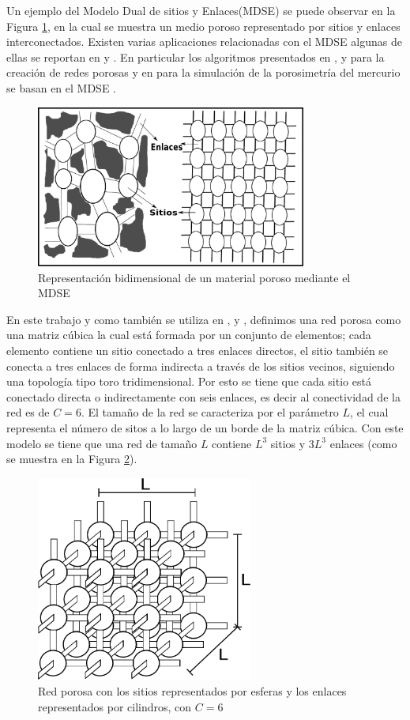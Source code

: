 Un ejemplo del Modelo Dual de sitios y Enlaces(MDSE) se puede observar en la Figura \ref{fig:dbsm}, en la cual se muestra un medio poroso representado por sitios y enlaces interconectados. Existen varias aplicaciones relacionadas con el MDSE algunas de ellas se reportan en \cite{ref8} y \cite{ref10}. En particular los algoritmos presentados en \cite{ref2}, \cite{ref3} y \cite{ref4} para la creación de redes porosas y en \cite{ref7} para la simulación de la porosimetría del mercurio se basan en el MDSE \cite{ref1}.\\

\begin{figure}[hbtp]
\centering
\includegraphics[width=3.5in]{img/dsbm_es.pdf}
\caption{Representación bidimensional de un material poroso mediante el MDSE}
\label{fig:dbsm}
\end{figure}

En este trabajo y como también se utiliza en \cite{ref2}, \cite{ref3} y \cite{ref4}, definimos una red porosa como una matriz cúbica la cual está formada por un conjunto de elementos; cada elemento contiene un sitio conectado a tres enlaces directos, el sitio tambi\'en se conecta a tres enlaces de forma indirecta a través de los sitios vecinos, siguiendo una topología tipo toro tridimensional. Por esto se tiene que cada sitio est\'a conectado directa o indirectamente con seis enlaces, es decir al conectividad de la red es de $C=6$. El tamaño de la red se caracteriza por el parámetro $L$, el cual representa el número de sitos a lo largo de un borde de la matriz cúbica. Con este modelo se tiene que una red de tamaño $L$ contiene $L^3$ sitios y $3L^3$ enlaces (como se muestra en la Figura \ref{fig:lattice3d}).

\begin{figure}[hbtp]
\centering
\includegraphics[width=2.8in]{img/red.pdf}
\caption{Red porosa con los sitios representados por esferas y los enlaces representados por cilindros, con $C=6$}
\label{fig:lattice3d}
\end{figure}
 

